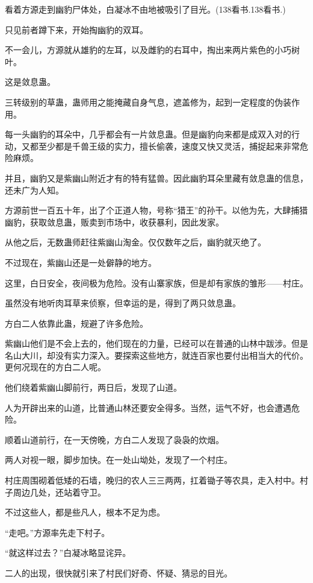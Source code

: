 
\begin{this_body}

看着方源走到幽豹尸体处，白凝冰不由地被吸引了目光。(138看书.138看书.)

只见前者蹲下来，开始掏幽豹的双耳。

不一会儿，方源就从雄豹的左耳，以及雌豹的右耳中，掏出来两片紫色的小巧树叶。

这是敛息蛊。

三转级别的草蛊，蛊师用之能掩藏自身气息，遮盖修为，起到一定程度的伪装作用。

每一头幽豹的耳朵中，几乎都会有一片敛息蛊。但是幽豹向来都是成双入对的行动，又都至少都是千兽王级的实力，擅长偷袭，速度又快又灵活，捕捉起来非常危险麻烦。

并且，幽豹又是紫幽山附近才有的特有猛兽。因此幽豹耳朵里藏有敛息蛊的信息，还未广为人知。

方源前世一百五十年，出了个正道人物，号称“猎王”的孙干。以他为先，大肆捕猎幽豹，获取敛息蛊，贩卖到市场中，收获暴利，因此发家。

从他之后，无数蛊师赶往紫幽山淘金。仅仅数年之后，幽豹就灭绝了。

不过现在，紫幽山还是一处僻静的地方。

这里，白日安全，夜间极为危险。没有山寨家族，但是却有家族的雏形——村庄。

虽然没有地听肉耳草来侦察，但幸运的是，得到了两只敛息蛊。

方白二人依靠此蛊，规避了许多危险。

紫幽山他们是不会上去的，他们现在的力量，已经可以在普通的山林中跋涉。但是名山大川，却没有实力深入。要探索这些地方，就连百家也要付出相当大的代价。更何况现在的方白二人呢。

他们绕着紫幽山脚前行，两日后，发现了山道。

人为开辟出来的山道，比普通山林还要安全得多。当然，运气不好，也会遭遇危险。

顺着山道前行，在一天傍晚，方白二人发现了袅袅的炊烟。

两人对视一眼，脚步加快。在一处山坳处，发现了一个村庄。

村庄周围砌着低矮的石墙，晚归的农人三三两两，扛着锄子等农具，走入村中。村子周边几处，还站着守卫。

不过这些人，都是些凡人，根本不足为虑。

“走吧。”方源率先走下村子。

“就这样过去？”白凝冰略显诧异。

二人的出现，很快就引来了村民们好奇、怀疑、猜忌的目光。


\end{this_body}
